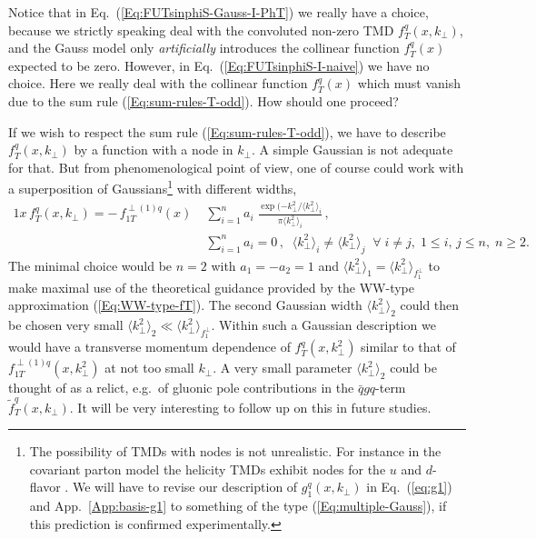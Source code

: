 \documentclass[a4paper,11pt]{article}
\newcommand{\la}{\langle}
\newcommand{\ra}{\rangle}
\def\kperp{k_\perp}
\begin{document}
Notice that in Eq.~(\ref{Eq:FUTsinphiS-Gauss-I-PhT}) we really have a 
choice, because we strictly speaking deal with the convoluted non-zero 
TMD $f_T^q(x,\kperp)$, and the Gauss model only {\it artificially} 
introduces the collinear function $f_T^q(x)$ expected to be zero.
However, in Eq.~(\ref{Eq:FUTsinphiS-I-naive}) we have no choice.
Here we really deal with the collinear function $f_T^q(x)$ which
must vanish due to the sum rule (\ref{Eq:sum-rules-T-odd}).
How should one proceed?

If we wish to respect the sum rule (\ref{Eq:sum-rules-T-odd}), 
we have to describe $f_T^q(x,\kperp)$ by a function with a node 
in $\kperp$. A simple Gaussian is not adequate for that. But from
phenomenological point of view, one of course could work with a 
superposition of Gaussians\footnote{
	The possibility of TMDs with nodes is not unrealistic.
	For instance in the covariant parton model the helicity TMDs 
	exhibit nodes for the $u$ and $d$- flavor \cite{Efremov:2010mt}.
	We will have to revise our description of $g_1^q(x,\kperp)$ 
	in Eq.~(\ref{eq:g1}) and App.~\ref{App:basis-g1} to something 
	of the type (\ref{Eq:multiple-Gauss}), if this prediction is 
	confirmed experimentally. }
with different widths, 
\begin{alignat}{1}
	x \, f_T^q(x,\kperp) =  - \, f_{1T}^{\perp (1)q}(x)\;
	&\sum\limits_{i=1}^{n} a_i\;
	\frac{\exp(-\kperp^2/\la\kperp^2\ra_i^{ }}{\pi\la\kperp^2\ra_i^{ }}\,,
	\nonumber\\
	&\sum\limits_{i=1}^n a_i = 0\,, \;\;
	\la\kperp^2\ra_i^{ }\neq\la\kperp^2\ra_j^{ }\;\;\forall\;i\neq j,
	\; 1\le i,\,j\le n,\;n\ge 2.\label{Eq:multiple-Gauss}
\end{alignat}
The minimal choice would be $n=2$ with $a_1=-a_2=1$ and
$\la\kperp^2\ra_1^{ } = \la\kperp^2\ra_{f_1^\perp}$ to make maximal use 
of the theoretical guidance provided by the WW-type approximation 
(\ref{Eq:WW-type-fT}). 
The second Gaussian width $\la\kperp^2\ra_2^{ }$ could then be chosen
very small $\la\kperp^2\ra_2^{ } \ll \la\kperp^2\ra_{f_1^\perp}$.
Within such a Gaussian description we would have a transverse momentum 
dependence of $f_T^{q}(x,\kperp^2)$ similar to that of 
$f_{1T}^{\perp(1)q}(x,\kperp^2)$ at not too small $\kperp$. 
A very small parameter $\la\kperp^2\ra_2^{ }$ could be thought of as 
a relict, e.g.\ of gluonic pole contributions in the $\bar qgq$-term 
$\tilde{f}_T^q(x,\kperp)$. It will be very interesting to follow up
on this in future studies.
\end{document}
